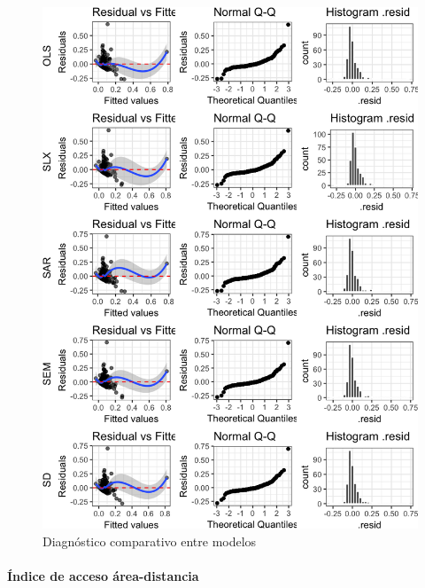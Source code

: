 \documentclass[12pt,]{book}
\let\oldparagraph\paragraph
\renewcommand{\paragraph}[1]{\oldparagraph{#1}\mbox{}}
\begin{document}
\begin{figure}
\includegraphics[width=1\linewidth]{tesis-unigis_files/figure-latex/diag-model-areaep-espaciales-1} \caption{Diagnóstico comparativo entre modelos}\label{fig:diag-model-areaep-espaciales}
\end{figure}

\paragraph{Índice de acceso
área-distancia}\label{indice-de-acceso-area-distancia}
\end{document}
